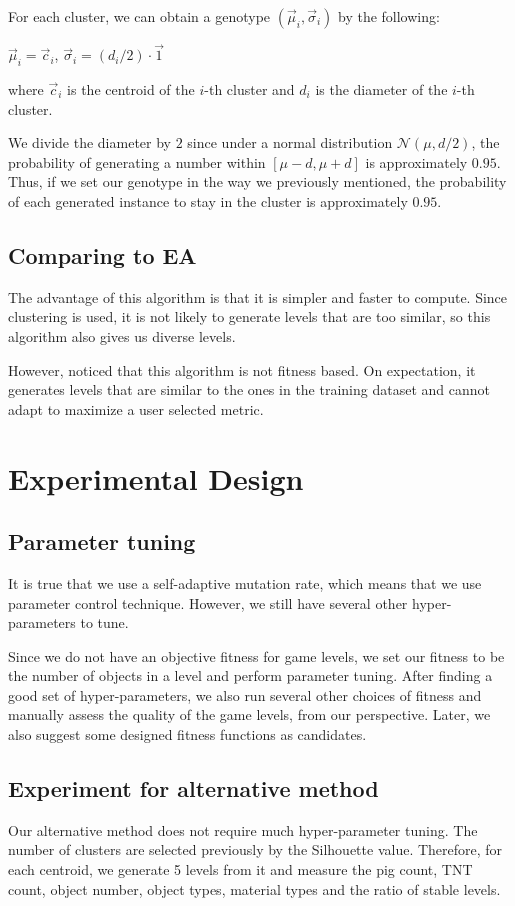 \documentclass[manuscript,screen,review]{acmart}
\begin{document}
For each cluster, we can obtain a genotype $(\vec{\mu}_i,\vec{\sigma}_i)$ by the following:

\indent\indent $\vec{\mu}_i=\vec{c}_i$, $\vec{\sigma}_i=(d_i/2)\cdot\vec{1}$

\indent\indent where $\vec{c}_i$ is the centroid of the $i$-th cluster and $d_i$ is the diameter of the $i$-th cluster.

We divide the diameter by $2$ since under a normal distribution $\mathcal{N}(\mu,d/2)$, the probability of generating a number within $[\mu-d,\mu+d]$ is approximately $0.95$. Thus, if we set our genotype in the way we previously mentioned, the probability of each generated instance to stay in the cluster is approximately $0.95$.

\subsection{Comparing to EA}
The advantage of this algorithm is that it is simpler and faster to compute. Since clustering is used, it is not likely to generate levels that are too similar, so this algorithm also gives us diverse levels.

However, noticed that this algorithm is not fitness based. On expectation, it generates levels that are similar to the ones in the training dataset and cannot adapt to maximize a user selected metric.

\section{Experimental Design}

\subsection{Parameter tuning}
It is true that we use a self-adaptive mutation rate, which means that we use parameter control technique. However, we still have several other hyper-parameters to tune.

Since we do not have an objective fitness for game levels, we set our fitness to be the number of objects in a level and perform parameter tuning. After finding a good set of hyper-parameters, we also run several other choices of fitness and manually assess the quality of the game levels, from our perspective. Later, we also suggest some designed fitness functions as candidates.

\subsection{Experiment for alternative method}
Our alternative method does not require much hyper-parameter tuning. The number of clusters are selected previously by the Silhouette value. Therefore, for each centroid, we generate 5 levels from it and measure the pig count, TNT count, object number, object types, material types and the ratio of stable levels.
\end{document}
